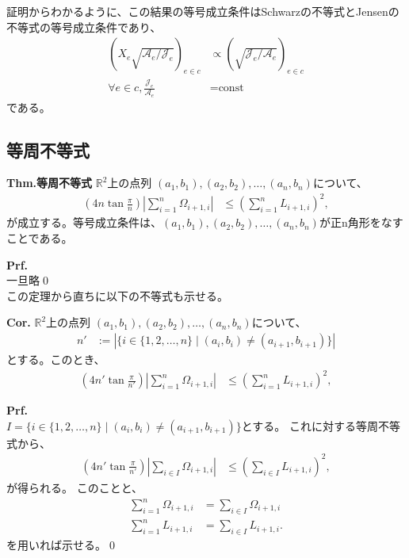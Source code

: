 \documentclass[a4paper,11pt]{jsarticle}
\numberwithin{equation}{section}
\begin{document}
証明からわかるように、この結果の等号成立条件はSchwarzの不等式とJensenの不等式の等号成立条件であり、
\begin{align}
    (X_{e}\sqrt{\mathcal{A}_e / \mathcal{J}_e} )_{e \in c} &\propto (\sqrt{\mathcal{J}_e / \mathcal{A}_e}) _{e \in c}\\
    \forall e \in c, \frac{\mathcal{J}_e}{\mathcal{A}_e} &= \text{const}
\end{align}
である。

\subsection{等周不等式}
\begin{itembox}[l]{\textbf{Thm.等周不等式}}
    $\mathbb{R}^2$上の点列
    $(a_1,b_1), (a_2,b_2), \ldots, (a_n,b_n)$について、
    \begin{align}
\left( 4n \tan \frac{\pi}{n} \right)
\left| \sum_{i=1}^{n} \Omega_{i+1,i} \right|
&\leq 
\left( \sum_{i=1}^{n} L_{i+1,i} \right)^2,
\end{align}
    が成立する。等号成立条件は、$(a_1,b_1), (a_2,b_2), \ldots, (a_n,b_n)$が正n角形をなすことである。
\end{itembox}
\textbf{Prf.}\\
一旦略\qed\\

この定理から直ちに以下の不等式も示せる。
\begin{itembox}[l]{\textbf{Cor.}}
    $\mathbb{R}^2$上の点列
    $(a_1,b_1), (a_2,b_2), \ldots, (a_n,b_n)$について、
    \begin{align}
        n' &:= \left| \{ i \in \{1,2,\ldots,n\} \mid (a_{i},b_{i}) \neq (a_{i+1},b_{i+1}) \} \right|
    \end{align}
    とする。このとき、
    \begin{align}
    \left( 4n' \tan \frac{\pi}{n'} \right)
    \left| \sum_{i=1}^{n} \Omega_{i+1,i} \right|
    &\leq
    \left( \sum_{i=1}^{n} L_{i+1,i} \right)^2,
    \end{align}
\end{itembox}
\textbf{Prf.}\\
$I = \{ i \in \{1,2,\ldots,n\} \mid (a_{i},b_{i}) \neq (a_{i+1},b_{i+1}) \}$とする。
これに対する等周不等式から、
\begin{align}
\left( 4n' \tan \frac{\pi}{n'} \right)
\left| \sum_{i \in I} \Omega_{i+1,i} \right|
&\leq
\left( \sum_{i \in I} L_{i+1,i} \right)^2,
\end{align}
が得られる。
このことと、
\begin{align}
\sum_{i=1}^{n} \Omega_{i+1,i} &= \sum_{i \in I} \Omega_{i+1,i}\\
\sum_{i=1}^{n} L_{i+1,i} &= \sum_{i \in I} L_{i+1,i}.
\end{align}
を用いれば示せる。\qed\\
\end{document}
